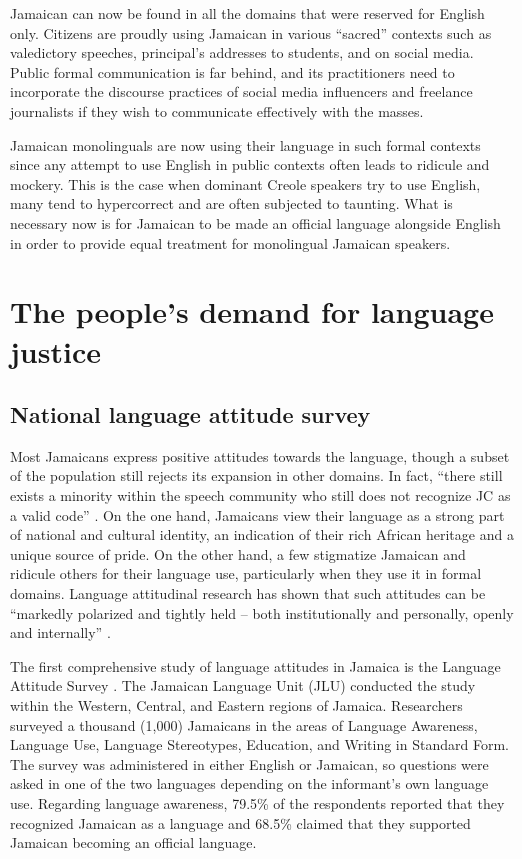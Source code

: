 \documentclass[output=paper,colorlinks,citecolor=brown]{langscibook}
\begin{document}
Jamaican can now be found in all the domains that were reserved for English only. Citizens are proudly using Jamaican in various “sacred” contexts such as valedictory speeches, principal’s addresses to students, and on social media. Public formal communication is far behind, and its practitioners need to incorporate the discourse practices of social media influencers and freelance journalists if they wish to communicate effectively with the masses.

Jamaican monolinguals are now using their language in such formal contexts since any attempt to use English in public contexts often leads to ridicule and mockery. This is the case when dominant Creole speakers try to use English, many tend to hypercorrect and are often subjected to taunting. What is necessary now is for Jamaican to be made an official language alongside English in order to provide equal treatment for monolingual Jamaican speakers. 


\section{The people’s demand for language justice}

\subsection{National language attitude survey}

Most Jamaicans express positive attitudes towards the language, though a subset of the population still rejects its expansion in other domains. In fact, “there still exists a minority within the speech community who still does not recognize JC as a valid code” \citep[225]{DevonishWalters2015}. On the one hand, Jamaicans view their language as a strong part of national and cultural identity, an indication of their rich African heritage and a unique source of pride. On the other hand, a few stigmatize Jamaican and ridicule others for their language use, particularly when they use it in formal domains. Language attitudinal research has shown that such attitudes can be “markedly polarized and tightly held – both institutionally and personally, openly and internally” \citep[58]{Beckford-Wassink1999}. 

The first comprehensive study of language attitudes in Jamaica is the Language Attitude Survey \citep{JamaicanLanguageUnit2005}. The Jamaican Language Unit (JLU) conducted the study within the Western, Central, and Eastern regions of Jamaica. Researchers surveyed a thousand (1,000) Jamaicans in the areas of Language Awareness, Language Use, Language Stereotypes, Education, and Writing in Standard Form. The survey was administered in either English or Jamaican, so questions were asked in one of the two languages depending on the informant's own language use. Regarding language awareness, 79.5\% of the respondents reported that they recognized Jamaican as a language and 68.5\% claimed that they supported Jamaican becoming an official language.
\end{document}

